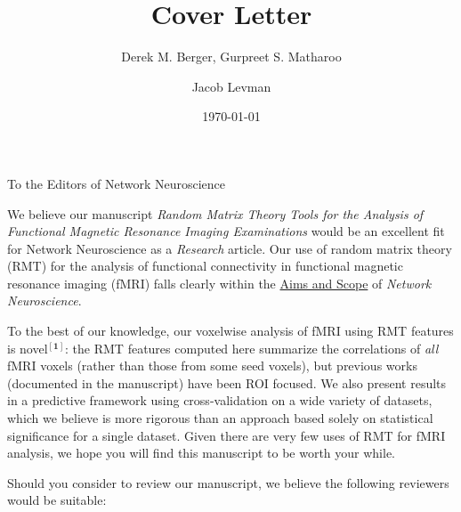 \documentclass[NETN,manuscript]{stjour-new}
\begin{document}
\title{Cover Letter}
\date{\today}

\author[Derek Berger, Gurpreet Matharoo, Jacob Levman]{
    Derek M. Berger,
    Gurpreet S. Matharoo
    \and Jacob Levman
}



To the Editors of Network Neuroscience

We believe our manuscript \emph{Random Matrix Theory Tools for the Analysis of Functional Magnetic
Resonance Imaging Examinations} would be an excellent fit for Network Neuroscience as a
\emph{Research} article. Our use of random matrix theory (RMT) for the analysis of functional
connectivity in functional magnetic resonance imaging (fMRI) falls clearly within the \href{https://direct.mit.edu/netn/pages/submission-guidelines#aims}{Aims and Scope}
of \emph{Network Neuroscience}.


To the best of our knowledge, our voxelwise analysis of fMRI using RMT features is novel\(\mathbf{^{[1]}}\): the RMT
features computed here summarize the correlations of \emph{all} fMRI voxels (rather than those from
some seed voxels), but previous works (documented in the manuscript) have been ROI focused. We also
present results in a predictive framework using cross-validation on a wide variety of datasets,
which we believe is more rigorous than an approach based solely on statistical significance for a
single dataset. Given there are very few uses of RMT for fMRI analysis, we hope you will find this
manuscript to be worth your while.

Should you consider to review our manuscript, we believe the following reviewers would be suitable:
\end{document}
